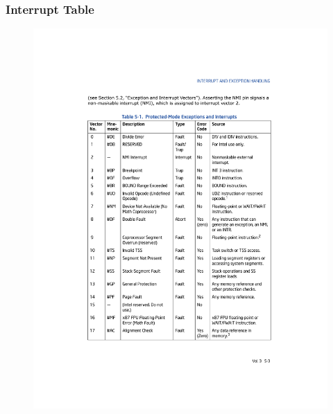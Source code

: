 \documentclass[aspectratio=169]{beamer}
\begin{document}
\begin{frame}
    \frametitle{Interrupt Table}
    \vspace{-0.7cm}
    \begin{figure}
    \centering
    \includegraphics[scale=0.65]{img/tabla_int1_1}
    \end{figure}
\end{frame}
\end{document}
